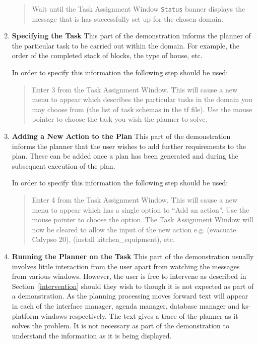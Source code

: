 \begin{enumerate}
\begin{quote}
Wait until the Task Assignment Window {\tt Status} banner displays the
message that is has successfully set up for the chosen domain. 
\end{quote}

\item {\bf Specifying the Task} \newline
This part of the demonstration informs the planner of the particular
task to be carried out within the domain. For example, the order of the
completed stack of blocks, the type of house, etc. 

In order to specify this information the following step should be
used:

\begin{quote}
Enter 3 from the Task Assignment Window. This will cause a new
menu to appear which describes the particular tasks in the domain you
may choose from (the list of task schemas in the {\sc tf} file). Use
the mouse pointer to choose the task you wish the planner to solve.  
\end{quote}

\item {\bf Adding a New Action to the Plan} \newline
This part of the demonstration informs the planner that the user
wishes to add further requirements to the plan. These can be added
once a plan has been generated and during the subsequent execution of
the plan. 

In order to specify this information the following step should be
used:

\begin{quote}
Enter 4 from the Task Assignment Window. This will cause a new menu
to appear which has a single option to ``Add an action''. Use the
mouse pointer to choose the option. The Task Assignment Window will
now be cleared to allow the input of the new action e.g. (evacuate
Calypso 20), (install kitchen\_equipment), etc. 
\end{quote}

\item {\bf Running the Planner on the Task} \newline 
This part of the demonstration usually involves little interaction
from the user apart from watching the messages from various windows.
However, the user is free to intervene as described in
Section~\ref{intervention} should they wish to though it is not
expected as part of a demonstration. As the planning processing moves
forward text will appear in each of the interface manager, agenda
manager, database manager and ks-platform windows respectively. The
text gives a trace of the planner as it solves the problem. It is not
necessary as part of the demonstration to understand the information
as it is being displayed.



\end{enumerate}
